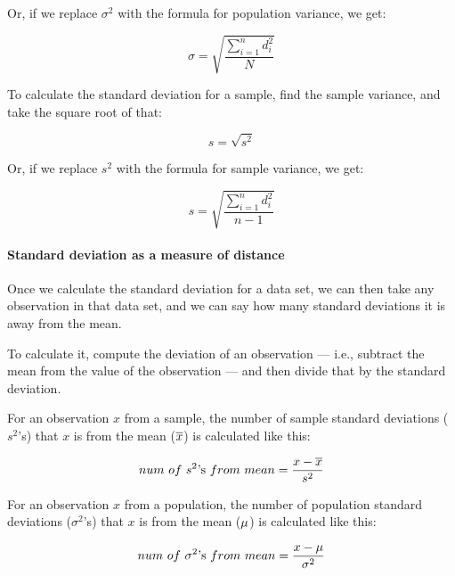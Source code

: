 \documentclass[../../../main.tex]{subfiles}
\begin{document}
\noindent
Or, if we replace $\sigma^{2}$ with the formula for population variance, we get:

\begin{equation*}
  \sigma = \sqrt{\frac{\sum\limits_{i=1}^{n} d^{2}_{i} }{N}}
\end{equation*}

\noindent
To calculate the standard deviation for a sample, find the sample variance, and take the square root of that:

\begin{equation*}
  s = \sqrt{s^{2}}
\end{equation*}

\noindent
Or, if we replace $s^{2}$ with the formula for sample variance, we get:

\begin{equation*}
  s = \sqrt{\frac{\sum\limits_{i=1}^{n} d^{2}_{i} }{n - 1}}
\end{equation*}


\paragraph{Standard deviation as a measure of distance}

Once we calculate the standard deviation for a data set, we can then take any observation in that data set, and we can say how many standard deviations it is away from the mean. 

To calculate it, compute the deviation of an observation --- i.e., subtract the mean from the value of the observation --- and then divide that by the standard deviation.

For an observation $x$ from a sample, the number of sample standard deviations ($s^{2}$'s) that $x$ is from the mean ($\overline{x}$) is calculated like this:

\begin{equation*}
  num~of~s^{2}\text{'s}~from~mean = \frac{x - \overline{x}}{s^{2}}
\end{equation*}

\noindent
For an observation $x$ from a population, the number of population standard deviations ($\sigma^{2}$'s) that $x$ is from the mean ($\mu{}$) is calculated like this:

\begin{equation*}
  num~of~\sigma^{2}\text{'s}~from~mean = \frac{x - \mu{}}{\sigma^{2}}
\end{equation*}
\end{document}
